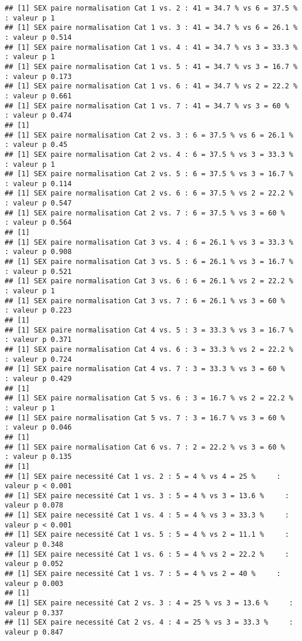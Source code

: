 \documentclass[
]{article}
\begin{document}
\begin{verbatim}
## [1] SEX paire normalisation Cat 1 vs. 2 : 41 = 34.7 % vs 6 = 37.5 %     : valeur p 1
## [1] SEX paire normalisation Cat 1 vs. 3 : 41 = 34.7 % vs 6 = 26.1 %     : valeur p 0.514
## [1] SEX paire normalisation Cat 1 vs. 4 : 41 = 34.7 % vs 3 = 33.3 %     : valeur p 1
## [1] SEX paire normalisation Cat 1 vs. 5 : 41 = 34.7 % vs 3 = 16.7 %     : valeur p 0.173
## [1] SEX paire normalisation Cat 1 vs. 6 : 41 = 34.7 % vs 2 = 22.2 %     : valeur p 0.661
## [1] SEX paire normalisation Cat 1 vs. 7 : 41 = 34.7 % vs 3 = 60 %     : valeur p 0.474
## [1] 
## [1] SEX paire normalisation Cat 2 vs. 3 : 6 = 37.5 % vs 6 = 26.1 %     : valeur p 0.45
## [1] SEX paire normalisation Cat 2 vs. 4 : 6 = 37.5 % vs 3 = 33.3 %     : valeur p 1
## [1] SEX paire normalisation Cat 2 vs. 5 : 6 = 37.5 % vs 3 = 16.7 %     : valeur p 0.114
## [1] SEX paire normalisation Cat 2 vs. 6 : 6 = 37.5 % vs 2 = 22.2 %     : valeur p 0.547
## [1] SEX paire normalisation Cat 2 vs. 7 : 6 = 37.5 % vs 3 = 60 %     : valeur p 0.564
## [1] 
## [1] SEX paire normalisation Cat 3 vs. 4 : 6 = 26.1 % vs 3 = 33.3 %     : valeur p 0.908
## [1] SEX paire normalisation Cat 3 vs. 5 : 6 = 26.1 % vs 3 = 16.7 %     : valeur p 0.521
## [1] SEX paire normalisation Cat 3 vs. 6 : 6 = 26.1 % vs 2 = 22.2 %     : valeur p 1
## [1] SEX paire normalisation Cat 3 vs. 7 : 6 = 26.1 % vs 3 = 60 %     : valeur p 0.223
## [1] 
## [1] SEX paire normalisation Cat 4 vs. 5 : 3 = 33.3 % vs 3 = 16.7 %     : valeur p 0.371
## [1] SEX paire normalisation Cat 4 vs. 6 : 3 = 33.3 % vs 2 = 22.2 %     : valeur p 0.724
## [1] SEX paire normalisation Cat 4 vs. 7 : 3 = 33.3 % vs 3 = 60 %     : valeur p 0.429
## [1] 
## [1] SEX paire normalisation Cat 5 vs. 6 : 3 = 16.7 % vs 2 = 22.2 %     : valeur p 1
## [1] SEX paire normalisation Cat 5 vs. 7 : 3 = 16.7 % vs 3 = 60 %     : valeur p 0.046
## [1] 
## [1] SEX paire normalisation Cat 6 vs. 7 : 2 = 22.2 % vs 3 = 60 %     : valeur p 0.135
## [1] 
## [1] SEX paire necessité Cat 1 vs. 2 : 5 = 4 % vs 4 = 25 %     : valeur p < 0.001
## [1] SEX paire necessité Cat 1 vs. 3 : 5 = 4 % vs 3 = 13.6 %     : valeur p 0.078
## [1] SEX paire necessité Cat 1 vs. 4 : 5 = 4 % vs 3 = 33.3 %     : valeur p < 0.001
## [1] SEX paire necessité Cat 1 vs. 5 : 5 = 4 % vs 2 = 11.1 %     : valeur p 0.348
## [1] SEX paire necessité Cat 1 vs. 6 : 5 = 4 % vs 2 = 22.2 %     : valeur p 0.052
## [1] SEX paire necessité Cat 1 vs. 7 : 5 = 4 % vs 2 = 40 %     : valeur p 0.003
## [1] 
## [1] SEX paire necessité Cat 2 vs. 3 : 4 = 25 % vs 3 = 13.6 %     : valeur p 0.337
## [1] SEX paire necessité Cat 2 vs. 4 : 4 = 25 % vs 3 = 33.3 %     : valeur p 0.847

\end{verbatim}
\end{document}
